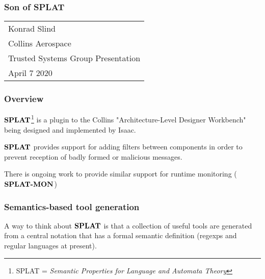 \documentclass{beamer}
\newcommand{\konst}[1]{\ensuremath{\mbox{\bf{#1}}}}
\begin{document}
\begin{frame}\frametitle{Son of SPLAT}

\hspace{50mm}
{\small
\begin{tabular}{l}
Konrad Slind \\ Collins Aerospace \\ Trusted Systems Group Presentation \\ April 7 2020
\end{tabular}
}

\end{frame}

\begin{frame}\frametitle{Overview}

\konst{SPLAT}\footnote{SPLAT = \textit{Semantic Properties for
    Language and Automata Theory}} is a plugin to the Collins
"Architecture-Level Designer Workbench" being designed and implemented
by Isaac.

\vspace{10mm}

\konst{SPLAT} provides support for adding filters between components
in order to prevent reception of badly formed or malicious messages.

\vspace{10mm}

There is ongoing work to provide similar support for runtime monitoring (\konst{SPLAT-MON})

\end{frame}

\begin{frame}\frametitle{Semantics-based tool generation}

A way to think about \konst{SPLAT} is that a collection of useful
tools are generated from a central notation that has a formal semantic
definition (regexps and regular languages at present).

\vspace*{10mm}

\end{frame}
\end{document}
